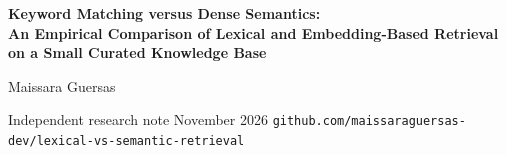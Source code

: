 \documentclass[11pt,a4paper]{article}
\newcommand{\code}[1]{\texttt{#1}}
\begin{document}
\begin{center}
    {\LARGE\bfseries Keyword Matching versus Dense Semantics:\\[4pt]
     An Empirical Comparison of Lexical and Embedding-Based Retrieval\\[2pt]
     on a Small Curated Knowledge Base\par}
    \vspace{10pt}
    {\large Maissara Guersas\par}
    \vspace{2pt}
    {\small Independent research note \textbullet{} November 2026 \textbullet{}
     \code{github.com/maissaraguersas-dev/lexical-vs-semantic-retrieval}\par}
\end{center}
\vspace{6pt}
\end{document}

